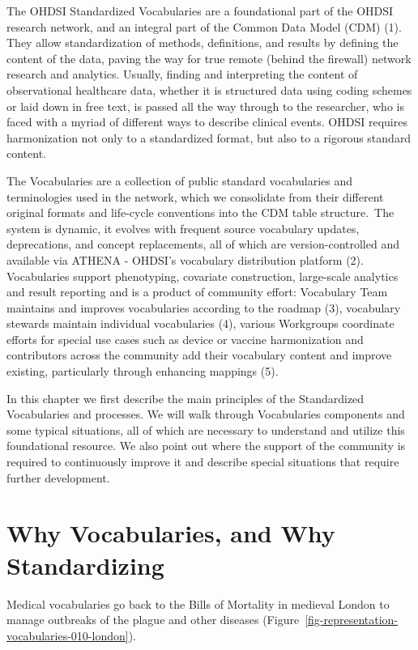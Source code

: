 \documentclass[
  letterpaper,
  paper=7in:10in,
  pagesize=pdftex,
  headinclude=on,
  footinclude=on,
  12pt]{scrbook}
\begin{document}
The OHDSI Standardized Vocabularies are a foundational part of the OHDSI
research network, and an integral part of the Common Data Model (CDM)
(1). They allow standardization of methods, definitions, and results by
defining the content of the data, paving the way for true remote (behind
the firewall) network research and analytics. Usually, finding and
interpreting the content of observational healthcare data, whether it is
structured data using coding schemes or laid down in free text, is
passed all the way through to the researcher, who is faced with a myriad
of different ways to describe clinical events. OHDSI requires
harmonization not only to a standardized format, but also to a rigorous
standard content.

The Vocabularies are a collection of public standard vocabularies and
terminologies used in the network, which we consolidate from their
different original formats and life-cycle conventions into the CDM table
structure.~The system is dynamic, it evolves with frequent source
vocabulary updates, deprecations, and concept replacements, all of which
are version-controlled and available via ATHENA - OHDSI's vocabulary
distribution platform (2). Vocabularies support phenotyping, covariate
construction, large-scale analytics and result reporting and is a
product of community effort: Vocabulary Team maintains and improves
vocabularies according to the roadmap (3), vocabulary stewards maintain
individual vocabularies (4), various Workgroups coordinate efforts for
special use cases such as device or vaccine harmonization and
contributors across the community add their vocabulary content and
improve existing, particularly through enhancing mappings (5).

In this chapter we first describe the main principles of the
Standardized Vocabularies and processes. We will walk through
Vocabularies components and some typical situations, all of which are
necessary to understand and utilize this foundational resource. We also
point out where the support of the community is required to continuously
improve it and describe special situations that require further
development.

\section{Why Vocabularies, and Why
Standardizing}\label{why-vocabularies-and-why-standardizing}

Medical vocabularies go back to the Bills of Mortality in medieval
London to manage outbreaks of the plague and other diseases
(Figure~\ref{fig-representation-vocabularies-010-london}).
\end{document}
